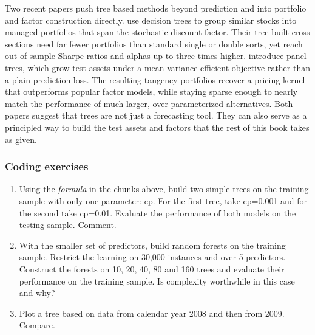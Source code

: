 Two recent papers push tree based methods beyond prediction and into portfolio and factor construction directly. \cite{bryzgalova2025forest} use decision trees to group similar stocks into managed portfolios that span the stochastic discount factor. Their tree built cross sections need far fewer portfolios than standard single or double sorts, yet reach out of sample Sharpe ratios and alphas up to three times higher. \cite{cong2025growing} introduce panel trees, which grow test assets under a mean variance efficient objective rather than a plain prediction loss. The resulting tangency portfolios recover a pricing kernel that outperforms popular factor models, while staying sparse enough to nearly match the performance of much larger, over parameterized alternatives. Both papers suggest that trees are not just a forecasting tool. They can also serve as a principled way to build the test assets and factors that the rest of this book takes as given.

\subsubsection{Coding exercises}

\begin{enumerate}
\item Using the \textit{formula} in the chunks above, build two simple trees on the training sample with only one parameter: cp. For the first tree, take cp=0.001 and for the second take cp=0.01. Evaluate the performance of both models on the testing sample. Comment.
\item With the smaller set of predictors, build random forests on the training sample. Restrict the learning on 30,000 instances and over 5 predictors. Construct the forests on 10, 20, 40, 80 and 160 trees and evaluate their performance on the training sample. Is complexity worthwhile in this case and why?
\item Plot a tree based on data from calendar year 2008 and then from 2009. Compare.
\end{enumerate}